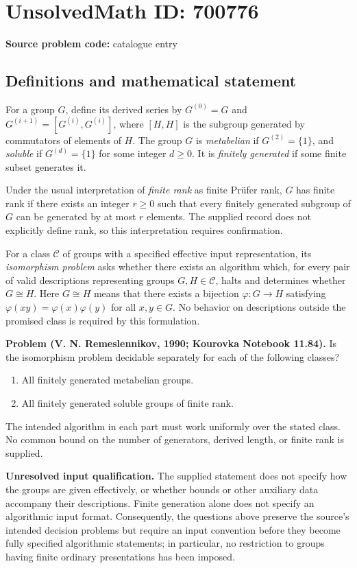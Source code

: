 \documentclass[11pt]{article}
\begin{document}
\section*{UnsolvedMath ID: 700776}
\textbf{Source problem code:} catalogue entry
\subsection{Definitions and mathematical statement}
For a group \(G\), define its derived series by \(G^{(0)}=G\) and \(G^{(i+1)}=[G^{(i)},G^{(i)}]\), where \([H,H]\) is the subgroup generated by commutators of elements of \(H\). The group \(G\) is \emph{metabelian} if \(G^{(2)}=\{1\}\), and \emph{soluble} if \(G^{(d)}=\{1\}\) for some integer \(d\geq 0\). It is \emph{finitely generated} if some finite subset generates it.

Under the usual interpretation of \emph{finite rank} as finite Pr\"ufer rank, \(G\) has finite rank if there exists an integer \(r\geq 0\) such that every finitely generated subgroup of \(G\) can be generated by at most \(r\) elements. The supplied record does not explicitly define rank, so this interpretation requires confirmation.

For a class \(\mathcal C\) of groups with a specified effective input representation, its \emph{isomorphism problem} asks whether there exists an algorithm which, for every pair of valid descriptions representing groups \(G,H\in\mathcal C\), halts and determines whether \(G\cong H\). Here \(G\cong H\) means that there exists a bijection \(\varphi:G\to H\) satisfying \(\varphi(xy)=\varphi(x)\varphi(y)\) for all \(x,y\in G\). No behavior on descriptions outside the promised class is required by this formulation.

\textbf{Problem (V. N. Remeslennikov, 1990; Kourovka Notebook 11.84).} Is the isomorphism problem decidable separately for each of the following classes?
\begin{enumerate}
\item[(a)] All finitely generated metabelian groups.
\item[(b)] All finitely generated soluble groups of finite rank.
\end{enumerate}
The intended algorithm in each part must work uniformly over the stated class. No common bound on the number of generators, derived length, or finite rank is supplied.

\textbf{Unresolved input qualification.} The supplied statement does not specify how the groups are given effectively, or whether bounds or other auxiliary data accompany their descriptions. Finite generation alone does not specify an algorithmic input format. Consequently, the questions above preserve the source's intended decision problems but require an input convention before they become fully specified algorithmic statements; in particular, no restriction to groups having finite ordinary presentations has been imposed.
\end{document}
